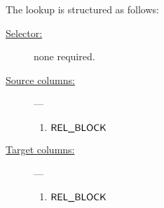 The lookup is structured as follows:
\begin{description}
	\item[\underline{Selector:}] none required.
	\item[\underline{Source columns:}] ---
		\begin{enumerate}
			\item $\textsf{REL\_BLOCK}$
		\end{enumerate}
	\item[\underline{Target columns:}] ---
		\begin{enumerate}
			\item $\textsf{REL\_BLOCK}$
		\end{enumerate}
\end{description}
